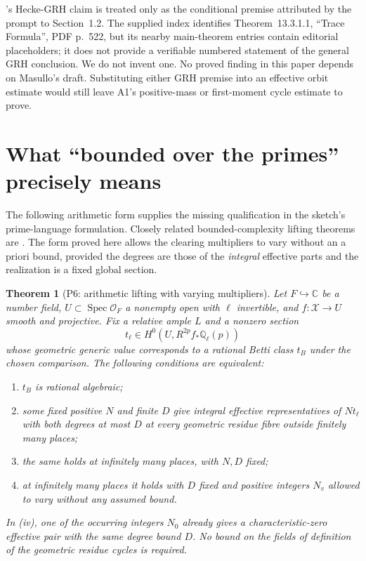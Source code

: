 \documentclass[11pt,a4paper]{article}
\newtheorem{theorem}{Theorem}[section]
\theoremstyle{definition}\newtheorem{definition}[theorem]{Definition}
\theoremstyle{remark}\newtheorem{remark}[theorem]{Remark}
\newcommand{\Q}{\mathbb Q}\newcommand{\Z}{\mathbb Z}\newcommand{\C}{\mathbb C}\newcommand{\R}{\mathbb R}
\newcommand{\cO}{\mathcal O}\newcommand{\CH}{\operatorname{CH}}\newcommand{\cl}{\operatorname{cl}}
\begin{document}
\citet{Masullo26}'s Hecke-GRH claim is treated only as the conditional premise attributed by the prompt to Section~1.2. The supplied index identifies Theorem~13.3.1.1, ``Trace Formula'', PDF p.~522, but its nearby main-theorem entries contain editorial placeholders; it does not provide a verifiable numbered statement of the general GRH conclusion. We do not invent one. No proved finding in this paper depends on Masullo's draft. Substituting either GRH premise into an effective orbit estimate would still leave A1's positive-mass or first-moment cycle estimate to prove.


\section{What ``bounded over the primes'' precisely means}\label{sec:primes}
The following arithmetic form supplies the missing qualification in the sketch's prime-language formulation. Closely related bounded-complexity lifting theorems are \citet[Definition~2.3 and Theorems~3.1, 3.4]{BrunjesSerpe09}. The form proved here allows the clearing multipliers to vary without an a priori bound, provided the degrees are those of the \emph{integral} effective parts and the realization is a fixed global section.

\begin{theorem}[P6: arithmetic lifting with varying multipliers]\label{P6}
Let $F\hookrightarrow\C$ be a number field, $U\subset\operatorname{Spec}\cO_F$ a nonempty open with $\ell$ invertible, and $f:\mathcal X\to U$ smooth and projective. Fix a relative ample $L$ and a nonzero section
\[
 t_\ell\in H^0(U,R^{2p}f_*\Q_\ell(p))
\]
whose geometric generic value corresponds to a rational Betti class $t_B$ under the chosen comparison. The following conditions are equivalent:
\begin{enumerate}[label=(\roman*)]
\item $t_B$ is rational algebraic;
\item some fixed positive $N$ and finite $D$ give integral effective representatives of $Nt_\ell$ with both degrees at most $D$ at every geometric residue fibre outside finitely many places;
\item the same holds at infinitely many places, with $N,D$ fixed;
\item at infinitely many places it holds with $D$ fixed and positive integers $N_v$ allowed to vary without any assumed bound.
\end{enumerate}
In (iv), one of the occurring integers $N_0$ already gives a characteristic-zero effective pair with the same degree bound $D$. No bound on the fields of definition of the geometric residue cycles is required.
\end{theorem}
\end{document}
